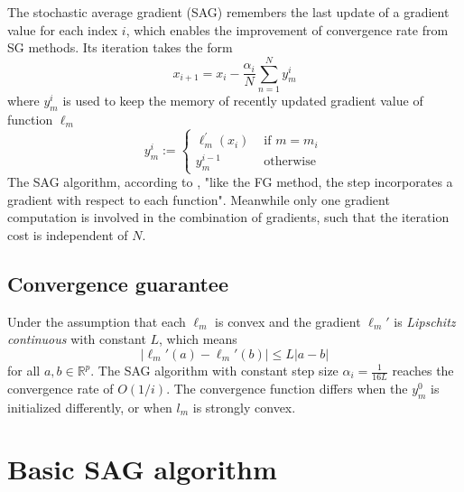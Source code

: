 The stochastic average gradient (SAG) remembers the last update of a gradient value for each index $i$, which enables the improvement of convergence rate from SG methods. Its iteration takes the form
\begin{equation}
x_{i+1} = x_i - \frac{\alpha_i}{N} \sum^N_{n=1}y_{m}^{i}
\end{equation}
where $y_{m}^{i}$ is used to keep the memory of recently updated gradient value of function $\ell_m$
\begin{equation}
y_{m}^{i}:=\left\{\begin{array}{ll}
    \ell_{m}^{\prime}\left(x_{i}\right) & \text { if } m=m_{i} \\
    y_{m}^{i-1} & \text { otherwise }
    \end{array}\right.
\end{equation}
The SAG algorithm, according to \citeauthor{schmidtMinimizingFiniteSums2016}, "like the FG method, the step incorporates a gradient with respect to each function". Meanwhile only one gradient computation is involved in the combination of gradients, such that the iteration cost is independent of $N$.

\subsection{Convergence guarantee}

Under the assumption that each $\ell_m$ is convex and the gradient $\ell_m\prime$ is \textit{Lipschitz continuous} with constant $L$, which means
\begin{equation}
|\ell_m\prime (a) - \ell_m\prime (b)| \leq L|a-b|
\end{equation}
for all $a,b \in \mathbb{R}^p$.
The SAG algorithm with constant step size $\alpha_i = \frac{1}{16L}$ reaches the convergence rate of $O(1/i)$. The convergence function differs when the $y_m^0$ is initialized differently, or when $l_m$ is strongly convex.


\section{Basic SAG algorithm}

